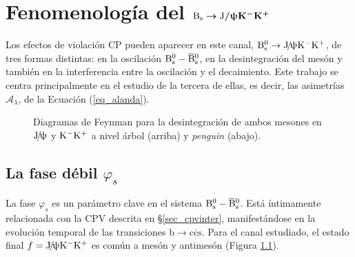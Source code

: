 \chapter[Fenomenología del $\Bs \rightarrow \Jpsi(\muon\antimuon) \kaon\antikaon$]{Fenomenología del $\bm{\text{B}_{\text{s}} \rightarrow \text{J}/\uppsi \mathrm{K}{}^{-} \mathrm{K}{}^{+}}$}
\label{cha:pheno}




Los efectos de violación CP pueden aparecer en este canal, \color{vero}$\mathrm{B}{}_{\mathrm{s}}^{0} \rightarrow \mathrm{J}\!/\!\uppsi \mathrm{K}{}^{-} \mathrm{K}{}^{+}$, \color{norm}   de tres formas distintas: en la oscilación $\mathrm{B}{}_{\mathrm{s}}^{0} - \overline{\mathrm{B}}{}_{\mathrm{s}}^{0}$, en la desintegración del mesón y también en la interferencia entre la oscilación y el decaimiento. Este trabajo se centra principalmente en el estudio de la tercera de ellas, es decir, las asimetrías $\mathscr{A}_{\lambda}$, de la Ecuación (\ref{eq_alanda}).



\begin{figure}[H]
\centering
{} \hfill
{} \hfill
%
 \hfill
{} \hfill
\caption{Diagramas de Feynman para la desintegración de ambos mesones en $\protect\mathrm{J}\!/\!\uppsi$ y $\mathrm{K}{}^{-}\mathrm{K}{}^{+}$ a nivel árbol (arriba) y \emph{penguin} (abajo).} \label{fig_decay}
\end{figure}



\section{La fase débil $\varphi_s$} %
\label{sec_phis}

La fase $\varphi_s$ es un parámetro clave en el sistema $\mathrm{B}{}_{\mathrm{s}}^{0} - \overline{\mathrm{B}}{}_{\mathrm{s}}^{0}$. Está íntimamente relacionada con la CPV descrita en \S \ref{sec_cpvinter}, manifestándose  en la evolución temporal de las transiciones $\mathrm{b \rightarrow c \overline{c}{s}}$. Para el canal estudiado, el estado final $f=\mathrm{J}\!/\!\uppsi \mathrm{K}{}^{-} \mathrm{K}{}^{+}$ es común a mesón y antimesón (Figura \ref{fig_decay}). 


